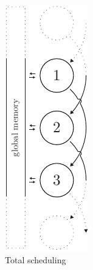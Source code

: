 \begin{figure}[h!]
  \begin{minipage}[t]{0.20\textwidth}
    \centering
    \includegraphics[page=1, height=2\linewidth]{../resources/invariance.pdf}
    \vfill
    \caption{Total scheduling}

\end{minipage}
\end{figure}
